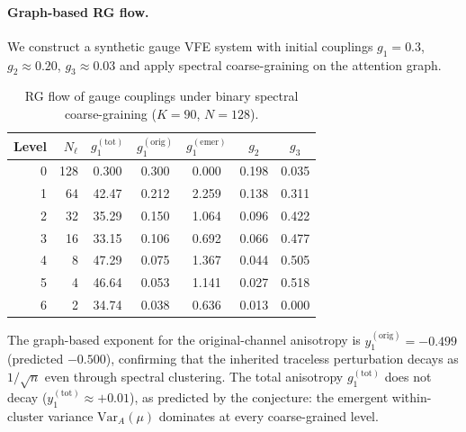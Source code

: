 \documentclass[twoside,11pt]{article}
\begin{document}
\paragraph{Graph-based RG flow.}
We construct a synthetic gauge VFE system with initial couplings $g_1 = 0.3$, $g_2 \approx 0.20$, $g_3 \approx 0.03$ and apply spectral coarse-graining on the attention graph.

\begin{table}[t]
\centering
\caption{RG flow of gauge couplings under binary spectral coarse-graining ($K = 90$, $N = 128$).}
\label{tab:rg_flow_supp}
\begin{tabular}{rrccccc}
\toprule
\textbf{Level} & $N_\ell$ & $g_1^{(\mathrm{tot})}$ & $g_1^{(\mathrm{orig})}$ & $g_1^{(\mathrm{emer})}$ & $g_2$ & $g_3$ \\
\midrule
0 & 128 & 0.300 & 0.300 & 0.000 & 0.198 & 0.035 \\
1 & 64 & 42.47 & 0.212 & 2.259 & 0.138 & 0.311 \\
2 & 32 & 35.29 & 0.150 & 1.064 & 0.096 & 0.422 \\
3 & 16 & 33.15 & 0.106 & 0.692 & 0.066 & 0.477 \\
4 & 8 & 47.29 & 0.075 & 1.367 & 0.044 & 0.505 \\
5 & 4 & 46.64 & 0.053 & 1.141 & 0.027 & 0.518 \\
6 & 2 & 34.74 & 0.038 & 0.636 & 0.013 & 0.000 \\
\bottomrule
\end{tabular}
\end{table}

The graph-based exponent for the original-channel anisotropy is $y_1^{(\mathrm{orig})} = -0.499$ (predicted $-0.500$), confirming that the inherited traceless perturbation decays as $1/\sqrt{n}$ even through spectral clustering. The total anisotropy $g_1^{(\mathrm{tot})}$ does not decay ($y_1^{(\mathrm{tot})} \approx +0.01$), as predicted by the conjecture: the emergent within-cluster variance $\mathrm{Var}_A(\mu)$ dominates at every coarse-grained level.
\end{document}
